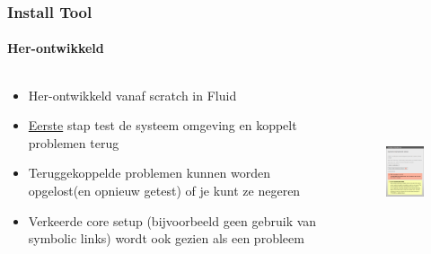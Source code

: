 \begin{frame}[fragile]
	\frametitle{Install Tool}
	\framesubtitle{Her-ontwikkeld}

	\begin{columns}[T]

		\begin{column}{.5\textwidth}
			\begin{itemize}
				\item Her-ontwikkeld vanaf scratch in Fluid
				\item \underline{Eerste} stap test de systeem omgeving en koppelt problemen terug
				\item Teruggekoppelde problemen kunnen worden opgelost\newline (en opnieuw getest) of je kunt ze negeren
				\item Verkeerde core setup (bijvoorbeeld geen gebruik van symbolic links) wordt ook gezien als een probleem
			\end{itemize}
		\end{column}

		\begin{column}{.5\textwidth}
			\begin{figure}\vspace*{-0.4cm}
				\includegraphics[width=0.8\linewidth,height=5cm]{Images/InstallTool/SystemEnvironmentCheck.png}
			\end{figure}
		\end{column}

	\end{columns}

\end{frame}


